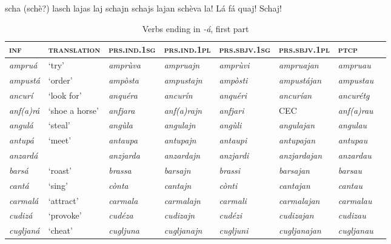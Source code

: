 scha (schè?) lasch lajas laj schajn schajs lajan schèva la! Lá fá quaj! Schaj!
 
\begin{sidewaystable} 
	\caption{Verbs ending in \textit{-á}, first part}

	\begin{tabularx}{\textwidth}{llllllll} 
		\lsptoprule
	\textsc{\textbf{inf}} & \textsc{\textbf{translation}} & \textsc{\textbf{prs.ind.1sg}} & \textsc{\textbf{prs.ind.1pl}} & \textsc{\textbf{prs.sbjv.1sg}} & \textsc{\textbf{prs.sbjv.1pl}} & \textsc{\textbf{ptcp}} \\
	\midrule
		\textit{ampruá} & `try' & \textit{amprùva} & \textit{ampruajn} &  \textit{amprùvi} & \textit{ampruajan} & \textit{ampruau}& \\
		\textit{ampustá} & `order' & \textit{ampòsta} & \textit{ampustajn} & \textit{ampòsti} & \textit{ampustájan} & \textit{ampustau} & \\
		\textit{ancurí} & `look for' & \textit{anquéra} & \textit{ancurín} & \textit{anquéri} & \textit{ancurían} & \textit{ancurétg}& \\
		\textit{anf(a)rá} & ‘shoe a horse’ & \textit{anfjara} & \textit{anf(a)rajn} &  \textit{anfjari} & CEC& \textit{anf(a)rau}& \\ 
		\textit{angulá} & `steal' & \textit{angùla} & \textit{angulajn} & \textit{angùli} & \textit{angulajan} & \textit{angulau}& \\
		\textit{antupá} & `meet' & \textit{antaupa} & \textit{antupajn} & \textit{antaupi} & \textit{antupajan} & \textit{antupau}& \\ 
		\textit{anzardá} & & \textit{anzjarda} & \textit{anzardajn} & \textit{anzjardi} & \textit{anzjardajan} & \textit{anzardau}& \\
		\textit{barsá} & ‘roast’ & \textit{brassa} & \textit{barsajn} & \textit{brassi}& \textit{barsajan} & \textit{barsau} & \\ 
		\textit{cantá} & ‘sing’ & \textit{cònta} & \textit{cantajn} & \textit{cònti} & \textit{cantajan} & \textit{cantau}& \\
		\textit{carmalá} & ‘attract’& \textit{carmala} & \textit{carmalajn} & \textit{carmali} & \textit{carmalajan} & \textit{carmalau}& \\ 
		\textit{cudizá} & ‘provoke’ & \textit{cudéza} & \textit{cudizajn} & \textit{cudézi} & \textit{cudizajan} & \textit{cudizau}& \\ 
		\textit{cugljaná} & ‘cheat’ & \textit{cugljuna} & \textit{cugljanajn} & \textit{cugljuni} & \textit{cugljanajan} & \textit{cugljanau}& \\ 

\end{tabularx}
\end{sidewaystable}
